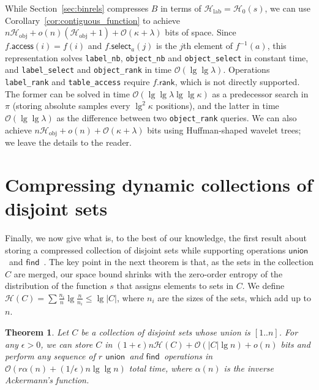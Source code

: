 \documentclass[11pt]{article}
\newtheorem{theorem}{Theorem}
\newcommand{\Oh}[1]
    {\ensuremath{\mathcal{O}\left( {#1} \right)}}
\newcommand{\access}
    {\ensuremath{\mathsf{access}}}
\newcommand{\rank}
    {\ensuremath{\mathsf{rank}}}
\newcommand{\select}
    {\ensuremath{\mathsf{select}}}
\newcommand{\union}
    {\ensuremath{\mathsf{union}}}
\newcommand{\find}
    {\ensuremath{\mathsf{find}}}
\newcommand{\HH}{\mathcal{H}}
\newcommand{\Ho}{\HH_0}
\begin{document}
While Section~\ref{sec:binrels} compresses $B$ in terms of $\HH_\mathrm{lab} =
\Ho(s)$, we can use Corollary~\ref{cor:contiguous_function} to achieve
$n\HH_\mathrm{obj} + o(n)(\HH_\mathrm{obj}+1) + \Oh{\kappa + \lambda}$ 
bits of space. Since $f.\access(i) = f(i)$ and $f.\select_a(j)$
is the $j$th element of $f^{-1}(a)$, this representation solves 
{\tt label\_nb}, {\tt object\_nb} and {\tt object\_select} in constant time, 
and {\tt label\_select} and {\tt object\_rank} in time $\Oh{\lg\lg\lambda}$.
Operations {\tt label\_rank} and {\tt table\_access} require $f.\rank$,
which is not directly supported. The former can be solved in time
$\Oh{\lg\lg\lambda \lg\lg\kappa}$ as a predecessor search in $\pi$
(storing absolute samples every $\lg^2\kappa$ positions), and the 
latter in time $\Oh{\lg\lg\lambda}$ as the difference between two 
{\tt object\_rank} queries.
We can also achieve $n\HH_\mathrm{obj} + o(n) + \Oh{\kappa+\lambda}$
bits using Huffman-shaped wavelet trees; we leave the details to the reader.

\section{Compressing dynamic collections of disjoint sets} \label{sec:unionfind}

Finally, we now give what is, to the best of our knowledge, the first result 
about storing a compressed collection of disjoint sets while supporting 
operations \union\ and \find~\cite{TvL84}.  The key point in the next theorem 
is that, as the sets in the collection $C$ are merged, our space bound shrinks 
with the zero-order entropy of the distribution of the function $s$ that 
assigns elements to sets in $C$. We define $\HH(C) = 
\sum\frac{n_i}{n}\lg\frac{n}{n_i} \le \lg |C|$,
where $n_i$ are the sizes of the sets, which add up to $n$.

\begin{theorem} \label{thm:disjoint}
  Let $C$ be a collection of disjoint sets whose union is \([1..n]\).
For any \(\epsilon > 0\), we can store $C$ in \((1 +
  \epsilon) n \HH (C) + \Oh{|C| \lg n} + o (n) \)
  bits and perform any sequence of $r$ \union\ and \find\
  operations in $\Oh{r\alpha(n) + (1/\epsilon)n\lg \lg n}$ total time,
  where $\alpha(n)$ is the inverse Ackermann's function.
\end{theorem}
\end{document}
